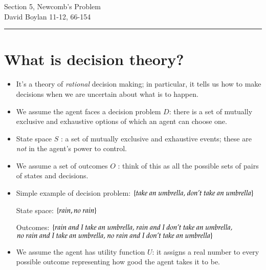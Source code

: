 \documentclass[justified]{tufte-handout}
\newcommand{\HRule}{\rule{\linewidth}{0.1mm}}
\begin{document}
\frenchspacing

\begin{fullwidth}
\noindent\Large Section 5,  Newcomb's Problem \large \\[.3cm]
\noindent  David Boylan \hfill{11-12, 66-154}

\noindent\HRule
\end{fullwidth}

\section{What is decision theory?}

\begin{itemize}

\item It's a theory of \emph{rational} decision making; in particular, it tells us how to make decisions when we are uncertain about what is to happen. 

\item We assume the agent faces a decision problem $D$: there is a set of mutually exclusive and exhaustive options of which an agent can choose one.


\item State space $S$ : a set of mutually exclusive and exhaustive events; these are \emph{not} in the agent's power to control.

\item We assume a set of outcomes $O$ : think of this as all the possible sets of pairs of states and decisions.

\item Simple example of decision problem: $\{\emph{take an umbrella, don't take an umbrella}\}$

\vspace{.2cm}

\noindent State space: $\{rain, \emph{no rain}\}$


\vspace{.2cm}

\noindent Outcomes: $\{\emph{rain and I take an umbrella, rain and I don't take an umbrella,}$ \\$\emph{no rain and I take an umbrella, no rain and I don't take an umbrella}\}$


\item We assume the agent has utility function $U$: it assigns a real number to every possible outcome representing how good the agent takes it to be.



\end{itemize}
\end{document}
